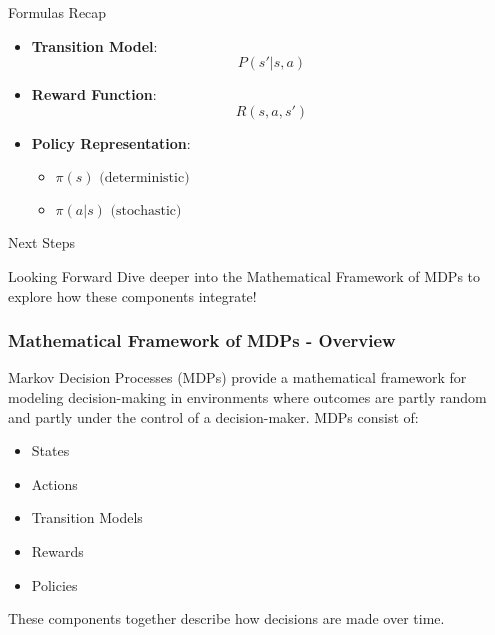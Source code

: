 \documentclass[aspectratio=169]{beamer}
\begin{document}
\begin{frame}[fragile]{Formulas Recap}
    \begin{itemize}
        \item \textbf{Transition Model}: 
            \begin{equation}
                P(s' | s, a)
            \end{equation}
        \item \textbf{Reward Function}: 
            \begin{equation}
                R(s, a, s')
            \end{equation}
        \item \textbf{Policy Representation}: 
            \begin{itemize}
                \item \(\pi(s) \text{ (deterministic)}\)
                \item \(\pi(a | s) \text{ (stochastic)}\)
            \end{itemize}
    \end{itemize}
\end{frame}

\begin{frame}[fragile]{Next Steps}
    \begin{block}{Looking Forward}
        Dive deeper into the Mathematical Framework of MDPs to explore how these components integrate!
    \end{block}
\end{frame}

\begin{frame}[fragile]
    \frametitle{Mathematical Framework of MDPs - Overview}
    Markov Decision Processes (MDPs) provide a mathematical framework for modeling decision-making in environments where outcomes are partly random and partly under the control of a decision-maker. MDPs consist of:
    \begin{itemize}
        \item States
        \item Actions
        \item Transition Models
        \item Rewards
        \item Policies
    \end{itemize}
    These components together describe how decisions are made over time.
\end{frame}
\end{document}
